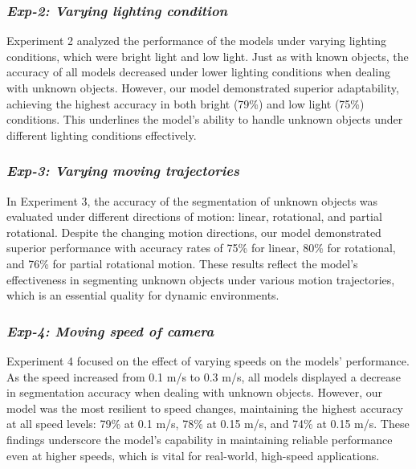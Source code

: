 \documentclass[lettersize,journal]{IEEEtran}
\begin{document}
\subsubsection{\textbf{\textit{Exp-2: Varying lighting condition}}} 
\label{subsubsection : light conditions results}

Experiment 2 analyzed the performance of the models under varying lighting conditions, which were bright light and low light. Just as with known objects, the accuracy of all models decreased under lower lighting conditions when dealing with unknown objects. However, our model demonstrated superior adaptability, achieving the highest accuracy in both bright (79\%) and low light (75\%) conditions. This underlines the model's ability to handle unknown objects under different lighting conditions effectively.



\subsubsection{\textbf{\textit{Exp-3: Varying moving trajectories}}} 
\label{subsubsection : Trajecotries results}

In Experiment 3, the accuracy of the segmentation of unknown objects was evaluated under different directions of motion: linear, rotational, and partial rotational. Despite the changing motion directions, our model demonstrated superior performance with accuracy rates of 75\% for linear, 80\% for rotational, and 76\% for partial rotational motion. These results reflect the model's effectiveness in segmenting unknown objects under various motion trajectories, which is an essential quality for dynamic environments.



\subsubsection{\textbf{\textit{Exp-4: Moving speed of camera}}}
\label{subsubsection : speed results}

Experiment 4 focused on the effect of varying speeds on the models' performance. As the speed increased from 0.1 m/s to 0.3 m/s, all models displayed a decrease in segmentation accuracy when dealing with unknown objects. However, our model was the most resilient to speed changes, maintaining the highest accuracy at all speed levels: 79\% at 0.1 m/s, 78\% at 0.15 m/s, and 74\% at 0.15 m/s. These findings underscore the model's capability in maintaining reliable performance even at higher speeds, which is vital for real-world, high-speed applications.
\end{document}
